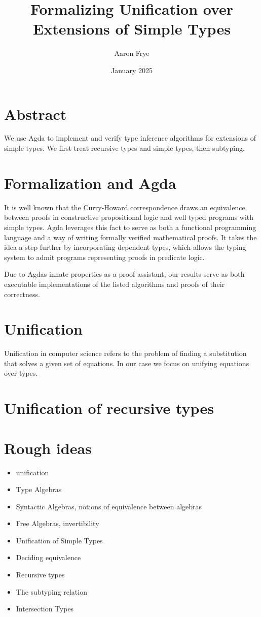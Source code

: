 \documentclass{article}
\title{Formalizing Unification over Extensions of Simple Types}
\author{Aaron Frye}
\date{January 2025}
\begin{document}
\maketitle

\section{Abstract}
We use Agda to implement and verify type inference algorithms for extensions of simple types. We first treat recursive types and simple types, then subtyping.

\section{Formalization and Agda}
It is well known that the Curry-Howard correspondence draws an equivalence between proofs in constructive propositional logic and well typed programs with simple types. Agda leverages this fact to serve as both a functional programming language
and a way of writing formally verified mathematical proofs. It takes the idea a step further by incorporating dependent types, which allows the typing system to admit programs representing proofs in predicate logic.

Due to Agdas innate properties as a proof assistant, our results serve as both executable implementations of the listed algorithms and proofs of their correctness.

\section{Unification}
Unification in computer science refers to the problem of finding a substitution that solves a given set of equations. In our case we focus on unifying equations over types.


\section{Unification of recursive types}

\section{Rough ideas}
\begin{itemize}
    \item{unification}
    \item{Type Algebras}
    \item{Syntactic Algebras, notions of equivalence between algebras}
    \item{Free Algebras, invertibility}
    \item{Unification of Simple Types}
    \item{Deciding equivalence}
    \item{Recursive types}
    \item{The subtyping relation}
    \item{Intersection Types}
\end{itemize}
\end{document}
